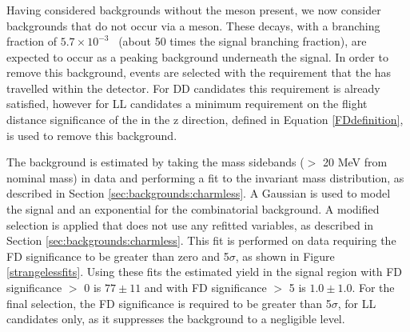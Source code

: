 \subsubsection{\boldmath \decay{\Bm}{\D\pim\pip\pim}}
\label{sec:backgrounds:b2dpipipi}

Having considered backgrounds without the \Dz meson present, we now consider backgrounds that do not occur via a \KS meson. These \decay{\Bm}{\D\pim\pip\pim} decays, with a branching fraction of $5.7 \times 10^{-3}$~\cite{PDG2014} (about 50 times the signal \decay{\Bm}{\D\Kstarm(\KS(\pip\pim)\pim)} branching fraction), are expected to occur as a peaking background underneath the signal. In order to remove this background, events are selected with the requirement that the \KS has travelled within the detector. For DD candidates this requirement is already satisfied, however for LL candidates a minimum requirement on the flight distance significance of the \KS in the z direction, defined in Equation \ref{FDdefinition}, is used to remove this background. 

The \decay{\Bm}{\D\pim\pip\pim} background is estimated by taking the \KS mass sidebands ($>$ 20 MeV from nominal \KS mass) in data and performing a fit to the invariant \Bm mass distribution, as described in Section \ref{sec:backgrounds:charmless}. A Gaussian is used to model the signal and an exponential for the combinatorial background. A modified selection is applied that does not use any refitted variables, as described in Section \ref{sec:backgrounds:charmless}. This fit is performed on \kpi data requiring the \KS FD significance to be greater than zero and 5$\sigma$, as shown in Figure \ref{strangelessfits}. Using these fits the estimated \decay{\Bm}{\D\pim\pip\pim} yield in the signal region with \KS FD significance $>$ 0 is $77 \pm 11$ and with \KS FD significance $>$ 5 is $1.0 \pm 1.0$. For the final selection, the \KS FD significance is required to be greater than 5$\sigma$, for LL candidates only, as it suppresses the \decay{\Bm}{\D\pim\pip\pim} background to a negligible level.

